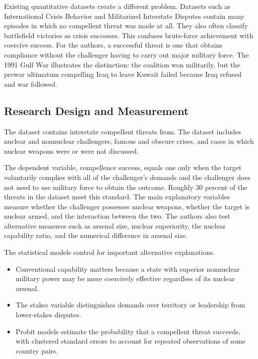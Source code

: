 Existing quantitative datasets create a different problem. Datasets such as International Crisis Behavior and Militarized Interstate Disputes contain many episodes in which no compellent threat was made at all. They also often classify battlefield victories as crisis successes. This confuses brute-force achievement with coercive success. For the authors, a successful threat is one that obtains compliance without the challenger having to carry out major military force. The 1991 Gulf War illustrates the distinction: the coalition won militarily, but the prewar ultimatum compelling Iraq to leave Kuwait failed because Iraq refused and war followed.

\subsection{Research Design and Measurement}

The dataset contains interstate compellent threats from. The dataset includes nuclear and nonnuclear challengers, famous and obscure crises, and cases in which nuclear weapons were or were not discussed.

The dependent variable, compellence success, equals one only when the target voluntarily complies with all of the challenger's demands and the challenger does not need to use military force to obtain the outcome. Roughly 30 percent of the threats in the dataset meet this standard. The main explanatory variables measure whether the challenger possesses nuclear weapons, whether the target is nuclear armed, and the interaction between the two. The authors also test alternative measures such as arsenal size, nuclear superiority, the nuclear capability ratio, and the numerical difference in arsenal size.

The statistical models control for important alternative explanations.
\begin{itemize}
    \item Conventional capability matters because a state with superior nonnuclear military power may be more coercively effective regardless of its nuclear arsenal.
    \item The stakes variable distinguishes demands over territory or leadership from lower-stakes disputes.
    \item Probit models estimate the probability that a compellent threat succeeds, with clustered standard errors to account for repeated observations of some country pairs.
\end{itemize}

